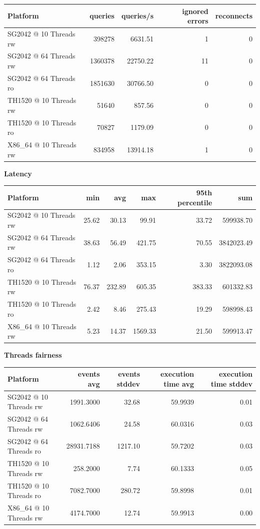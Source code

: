 \documentclass{article}
\begin{document}
\begin{table}[H]
\centering
\begin{tabular}{|l|r|r|r|r|}
\hline
Platform & queries & queries/s & ignored errors & reconnects \\
\hline
SG2042 @ 10 Threads rw & 398278 & 6631.51 & 1 & 0 \\
SG2042 @ 64 Threads rw & 1360378 & 22750.22 & 11 & 0 \\
SG2042 @ 64 Threads ro & 1851630 & 30766.50 & 0 & 0 \\
TH1520 @ 10 Threads rw & 51640 & 857.56 & 0 & 0 \\
TH1520 @ 10 Threads ro & 70827 & 1179.09 & 0 & 0 \\
X86\_64 @ 10 Threads rw & 834958 & 13914.18 & 1 & 0 \\
\hline
\end{tabular}
\end{table}

\textbf{Latency}

\begin{table}[H]
\centering
\begin{tabular}{|l|r|r|r|r|r|}
\hline
Platform & min & avg & max & 95th percentile & sum \\
\hline
SG2042 @ 10 Threads rw & 25.62 & 30.13 & 99.91 & 33.72 & 599938.70 \\
SG2042 @ 64 Threads rw & 38.63 & 56.49 & 421.75 & 70.55 & 3842023.49 \\
SG2042 @ 64 Threads ro & 1.12 & 2.06 & 353.15 & 3.30 & 3822093.08 \\
TH1520 @ 10 Threads rw & 76.37 & 232.89 & 605.35 & 383.33 & 601332.83 \\
TH1520 @ 10 Threads ro & 2.42 & 8.46 & 275.43 & 19.29 & 598998.43 \\
X86\_64 @ 10 Threads rw & 5.23 & 14.37 & 1569.33 & 21.50 & 599913.47 \\
\hline
\end{tabular}
\end{table}

\textbf{Threads fairness}

\begin{table}[H]
\centering
\begin{tabular}{|l|r|r|r|r|}
\hline
Platform & events avg & events stddev & execution time avg & execution time stddev \\
\hline
SG2042 @ 10 Threads rw & 1991.3000 & 32.68 & 59.9939 & 0.01 \\
SG2042 @ 64 Threads rw & 1062.6406 & 24.58 & 60.0316 & 0.03 \\
SG2042 @ 64 Threads ro & 28931.7188 & 1217.10 & 59.7202 & 0.03 \\
TH1520 @ 10 Threads rw & 258.2000 & 7.74 & 60.1333 & 0.05 \\
TH1520 @ 10 Threads ro & 7082.7000 & 280.72 & 59.8998 & 0.01 \\
X86\_64 @ 10 Threads rw & 4174.7000 & 12.74 & 59.9913 & 0.00 \\
\hline
\end{tabular}
\end{table}
\end{document}

